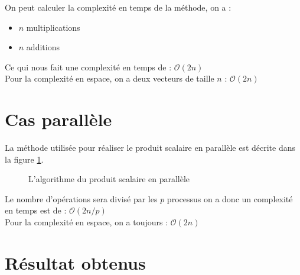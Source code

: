 \documentclass[a4paper]{article}
\begin{document}
On peut calculer la complexité en temps de la méthode, on a :
\begin{itemize}
\item $n$ multiplications
\item $n$ additions	
\end{itemize}
Ce qui nous fait une complexité en temps de : \textbf{$\mathcal{O}(2n)$} \\
Pour la complexité en espace, on a deux vecteurs de taille $n$ : \textbf{$\mathcal{O}(2n)$}


\section{Cas parallèle}

La méthode utilisée pour réaliser le produit scalaire en parallèle est décrite dans la figure \ref{fig:algo_ps_parallele}.

\begin{figure}[h]
	\caption{L'algorithme du produit scalaire en parallèle}%
	\label{fig:algo_ps_parallele}%
\end{figure}

Le nombre d'opérations sera divisé par les $p$ processus on a donc un complexité en temps est de : \textbf{$\mathcal{O}(2n / p)$} \\
Pour la complexité en espace, on a toujours : \textbf{$\mathcal{O}(2n)$}

\section{Résultat obtenus}
\end{document}
